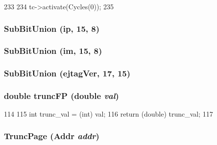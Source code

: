 \begin{DoxyCode}
233 {
234     tc->activate(Cycles(0));
235 }
\end{DoxyCode}
\hypertarget{namespaceMipsISA_aebb7b725b738cf03d41045fe15187006}{
\subsubsection[{SubBitUnion}]{\setlength{\rightskip}{0pt plus 5cm}SubBitUnion (ip, \/  15, \/  8)}}
\label{namespaceMipsISA_aebb7b725b738cf03d41045fe15187006}
\hypertarget{namespaceMipsISA_ab47da88f01b42dd221472b82e3ad0509}{
\subsubsection[{SubBitUnion}]{\setlength{\rightskip}{0pt plus 5cm}SubBitUnion (im, \/  15, \/  8)}}
\label{namespaceMipsISA_ab47da88f01b42dd221472b82e3ad0509}
\hypertarget{namespaceMipsISA_aada8c158cc81aa418c360bde1d4b9a59}{
\subsubsection[{SubBitUnion}]{\setlength{\rightskip}{0pt plus 5cm}SubBitUnion (ejtagVer, \/  17, \/  15)}}
\label{namespaceMipsISA_aada8c158cc81aa418c360bde1d4b9a59}
\hypertarget{namespaceMipsISA_a757a04b4d813824b1f006a8223f37966}{
\subsubsection[{truncFP}]{\setlength{\rightskip}{0pt plus 5cm}double truncFP (double {\em val})}}
\label{namespaceMipsISA_a757a04b4d813824b1f006a8223f37966}



\begin{DoxyCode}
114 {
115     int trunc_val = (int) val;
116     return (double) trunc_val;
117 }
\end{DoxyCode}
\hypertarget{namespaceMipsISA_afef87a2ebf00c4afe79598bf404860c7}{
\subsubsection[{TruncPage}]{ TruncPage ({\bf Addr} {\em addr})}}
\label{namespaceMipsISA_afef87a2ebf00c4afe79598bf404860c7}



